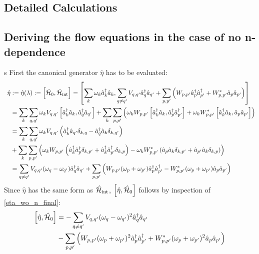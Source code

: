 \begin{appendix}

\chapter{Detailed Calculations}\label{Detailed Calculations}
\thispagestyle{empty}

\section{Deriving the flow equations in the case of no n-dependence}\label{Deriving the flow equations in the case of no n-dependence}s
First the canonical generator $\hat\eta$ has to be evaluated:
\begin{align}
\hat\eta&\vcentcolon=\hat\eta(\lambda)\vcentcolon=\left[\hat{\mathcal{H}}_0,\hat{\mathcal{H}}_{\mathrm{int}}\right] = \left[\sum\limits_k \omega_k \hat a^\dagger_k\hat a_k,\sum\limits_{q\neq q^\prime}V_{q,q^\prime}\hat a^\dagger_q\hat a_{q^\prime}+\sum\limits_{p,p^\prime}\left(W_{p,p^\prime}\hat a^\dagger_p\hat a^\dagger_{p^\prime}+W_{p,p^\prime}^*\hat a_p\hat a_{p^\prime}\right)\right]  \\ \quad& 
= \sum\limits_k\sum\limits_{q,q^\prime}\omega_kV_{q,q^\prime}\left[\hat a^\dagger_k\hat a_k,\hat a^\dagger_q\hat a_{q^\prime}\right]+\sum\limits_k\sum\limits_{p,p^\prime}\left(\omega_k W_{p,p^\prime}\left[\hat a^\dagger_k\hat a_k,\hat a^\dagger_p\hat a^\dagger_{p^\prime}\right]+\omega_k W_{p,p^\prime}^*\left[\hat a^\dagger_k\hat a_k,\hat a_p\hat a_{p^\prime}\right]\right) \nonumber \\ \quad& 
=\sum\limits_k\sum\limits_{q,q^\prime}\omega_kV_{q,q^\prime}\left(\hat a^\dagger_k\hat a_{q^\prime}\delta_{k,q}-\hat a^\dagger_q\hat a_k\delta_{k,q^\prime}\right) \nonumber \\ \quad& +\sum\limits_k\sum\limits_{p,p^\prime}\left(\omega_k W_{p,p^\prime}\left(\hat a^\dagger_k\hat a^\dagger_p\delta_{k,p^\prime}+\hat a^\dagger_k\hat a^\dagger_{p^\prime}\delta_{k,p}\right)-\omega_k W_{p,p^\prime}^*\left(\hat a_p\hat a_k\delta_{k,p^\prime}+\hat a_{p^\prime}\hat a_k\delta_{k,p}\right)\right) \nonumber \\ \quad& = \sum\limits_{q\neq q^\prime}V_{q,q^\prime}(\omega_q-\omega_{q^\prime})\hat a^\dagger_q\hat a_{q^\prime}+\sum\limits_{p,p^\prime}\left(W_{p,p^\prime}(\omega_p+\omega_{p^\prime})\hat a^\dagger_p\hat a^\dagger_{p^\prime}-W_{p,p^\prime}^*(\omega_p+\omega_{p^\prime})\hat a_p\hat a_{p^\prime}\right) \label{eta_wo_n_final}
\end{align}
Since $\hat\eta$ has the same form as $\hat{\mathcal{H}}_{\mathrm{int}}$, $\left[\hat\eta,\hat{\mathcal{H}}_0\right]$ follows by inspection of \ref{eta_wo_n_final}:
\begin{align}
\left[\hat\eta,\ham_0\right]&=-\Sum_{q\neq q^\prime}V_{q,q^\prime}(\omega_q-\omega_{q^\prime})^2\CR_q\AN_{q^\prime}\nonumber \\ \quad& -\Sum_{p,p^\prime}\left(W_{p,p^\prime}(\omega_p+\omega_{p^\prime})^2\CR_p\CR_{p^\prime}+W_{p,p^\prime}^*(\omega_p+\omega_{p^\prime})^2\AN_p\AN_{p^\prime}\right) 

\end{align}
\end{appendix}
